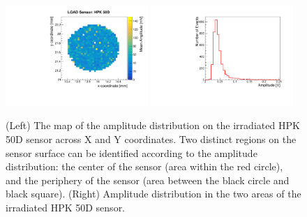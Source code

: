 \documentclass[preprint,1p]{elsarticle}
\begin{document}
\begin{figure}[htbp] 
\centering
\includegraphics[width=0.48\textwidth]{figs/USCSBoard_HPK50DIrradiated-CNMW11LGA35_Run936-961/HPK_irradiated_amp_Map.pdf} \hfill
\includegraphics[width=0.48\textwidth]{figs/USCSBoard_HPK50DIrradiated-CNMW11LGA35_Run936-961/HPK_irradiated_amp_1D.pdf} 
\caption{(Left) The map of the amplitude distribution on the irradiated HPK 50D sensor across X and Y coordinates. Two distinct regions on the sensor surface can be identified according to the amplitude distribution: the center of the sensor (area within the red circle), and the periphery of the sensor (area between the black circle and black square). (Right) Amplitude distribution in the two areas of the irradiated HPK 50D sensor.} 
\label{fig:Sensors} 
\end{figure} 
\end{document}
